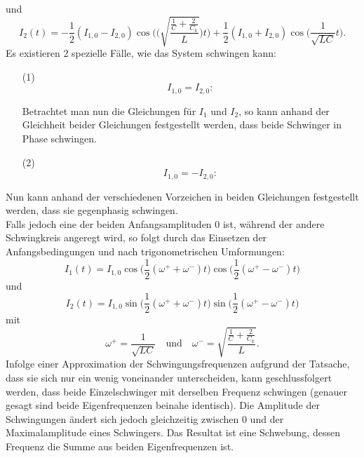 und
\begin{equation}
    I_2(t) = -\frac{1}{2}(I_{1,0}-I_{2,0})\cos\Biggl(\Biggl(\sqrt{\frac{\frac{1}{C}+\frac{2}{C_k}}{L}}\Biggr)t\Biggr)+\frac{1}{2}(I_{1,0}+I_{2,0})\cos\Biggl(\frac{1}{\sqrt{LC}}t\Biggr).
\end{equation}
Es existieren 2 spezielle Fälle, wie das System schwingen kann:
\begin{enumerate}
\item[(1)] 
    \begin{equation}
    I_{1,0}=I_{2,0}:
    \end{equation}

    Betrachtet man nun die Gleichungen für \(I_1\) und \(I_2\), so kann anhand der Gleichheit beider Gleichungen festgestellt werden, dass beide Schwinger in Phase schwingen.

\item[(2)]
    \begin{equation}
    I_{1,0}=-I_{2,0}:
    \end{equation}
\end{enumerate}
Nun kann anhand der verschiedenen Vorzeichen in beiden Gleichungen festgestellt werden, dass sie gegenphasig schwingen.
\\

Falls jedoch eine der beiden Anfangsamplituden 0 ist, während der andere Schwingkreis angeregt wird, so folgt durch das Einsetzen der Anfangsbedingungen und nach trigonometrischen Umformungen:
\begin{equation}
    I_1(t)=I_{1,0}\cos\Biggl(\frac{1}{2}(\omega^{+}+\omega^{-})t\Biggr)\cos\Biggl(\frac{1}{2}(\omega^{+}-\omega^{-})t\Biggr)
\end{equation}
und
\begin{equation}
    I_2(t)=I_{1,0}\sin\Biggl(\frac{1}{2}(\omega^{+}+\omega^{-})t\Biggr)\sin\Biggl(\frac{1}{2}(\omega^{+}-\omega^{-})t\Biggr)
\end{equation}
mit
\begin{equation}
    \omega^{+}=\frac{1}{\sqrt{LC}} \quad\textrm{und}\quad \omega^{-}=\sqrt{\frac{\frac{1}{C}+\frac{2}{C_k}}{L}}.
\end{equation}
Infolge einer Approximation der Schwingungsfrequenzen aufgrund der Tatsache, dass sie sich nur ein wenig voneinander unterscheiden, kann geschlussfolgert werden, dass beide Einzelschwinger mit derselben Frequenz schwingen (genauer gesagt sind beide Eigenfrequenzen beinahe identisch). Die Amplitude der Schwingungen ändert sich jedoch gleichzeitig zwischen 0 und der Maximalamplitude eines Schwingers. Das Resultat ist eine Schwebung, dessen Frequenz die Summe aus beiden Eigenfrequenzen ist.


